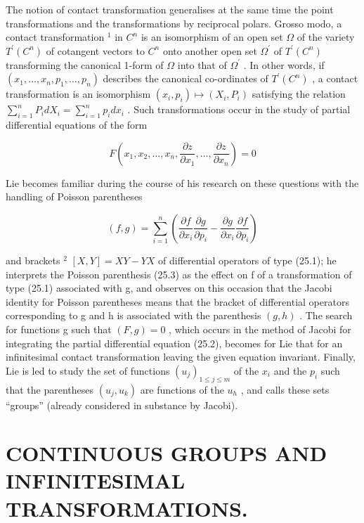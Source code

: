 The notion of contact transformation generalises at the same time the point transformations and the transformations by reciprocal polars. Grosso modo, a contact transformation \(^{1}\) in \(C^{n}\) is an isomorphism of an open set \(\Omega\) of the variety \(T^{\prime}(C^{n})\) of cotangent vectors to \(C^{n}\) onto another open set \(\Omega^{\prime}\) of \(T^{\prime}(C^{n})\) transforming the canonical 1-form of \(\Omega\) into that of \(\Omega^{\prime}\) . In other words, if \((x_{1},\ldots,x_{n},p_{1},\ldots,p_{n})\) describes the canonical co-ordinates of \(T^{\prime}(C^{n})\) , a contact transformation is an isomorphism \((x_{i},p_{i})\mapsto(X_{i},P_{i})\) satisfying the relation \(\sum_{i=1}^{n}P_{i}dX_{i}=\sum_{i=1}^{n}p_{i}dx_{i}\) . Such transformations occur in the study of partial differential equations of the form

\[
F \left(x _ {1}, x _ {2}, \dots , x _ {n}, \frac {\partial z}{\partial x _ {1}}, \dots , \frac {\partial z}{\partial x _ {n}}\right) = 0\tag{25.2}
\]

Lie becomes familiar during the course of his research on these questions with the handling of Poisson parentheses

\[
(f, g) = \sum_ {i = 1} ^ {n} \left(\frac {\partial f}{\partial x _ {i}} \frac {\partial g}{\partial p _ {i}} - \frac {\partial g}{\partial x _ {i}} \frac {\partial f}{\partial p _ {i}}\right)\tag{25.3}
\]

and brackets \(^{2}\) \([X,Y]=XY-YX\) of differential operators of type (25.1); he interprets the Poisson parenthesis (25.3) as the effect on f of a transformation of type (25.1) associated with g, and observes on this occasion that the Jacobi identity for Poisson parentheses means that the bracket of differential operators corresponding to g and h is associated with the parenthesis \((g,h)\) . The search for functions g such that \((F,g)=0\) , which occurs in the method of Jacobi for integrating the partial differential equation (25.2), becomes for Lie that for an infinitesimal contact transformation leaving the given equation invariant. Finally, Lie is led to study the set of functions \((u_{j})_{1\leq j\leq m}\) of the \(x_{i}\) and the \(p_{i}\) such that the parentheses \((u_{j},u_{k})\) are functions of the \(u_{h}\) , and calls these sets ``groups'' (already considered in substance by Jacobi).

\section{CONTINUOUS GROUPS AND INFINITESIMAL TRANSFORMATIONS.}

